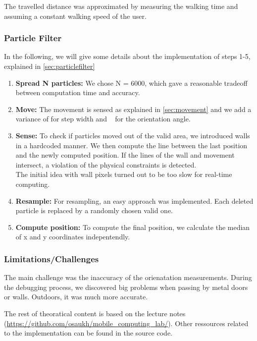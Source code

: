 \documentclass[12pt]{article}
\begin{document}
The travelled distance was approximated by measuring the walking time and assuming a constant walking speed of the user.


\subsubsection*{Particle Filter}
In the following, we will give some details about the implementation of steps 1-5, explained in \ref{sec:particlefilter}
\begin{enumerate}
	\item \textbf{Spread N particles:} We chose N = 6000, which gave a reasonable tradeoff between computation time and accuracy. 
	\item \textbf{Move:} The movement is sensed as explained in \ref{sec:movement} and we add a variance of \textpm 20cm for step width and \textdegree~ for the orientation angle.
	\item \textbf{Sense:} To check if particles moved out of the valid area, we introduced walls in a hardcoded manner. We then compute the line between the last position and the newly computed position. If the lines of the wall and movement intersect, a violation of the physical constraints is detected.\\
	The initial idea with wall pixels turned out to be too slow for real-time computing.
	\item \textbf{Resample:} For resampling, an easy approach was implemented. Each deleted particle is replaced by a randomly chosen valid one.
	\item \textbf{Compute position:} To compute the final position, we calculate the median of x and y coordinates indepentendly. 
\end{enumerate}

\subsubsection{Limitations/Challenges}
The main challenge was the inaccuracy of the orienatation measurements. During the debugging process, we discovered big problems when passing by metal doors or walls. Outdoors, it was much more accurate.





The rest of theoratical content is based on the lecture notes (\url{https://github.com/osaukh/mobile_computing_lab/}). Other ressources related to the implementation can be found in the source code.
\end{document}
